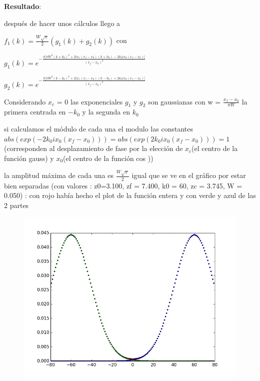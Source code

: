 \documentclass{article}
\begin{document}
\textbf{Resultado}:
\begin{description}
\item después de hacer unos cálculos llego a 
\item $f_1(k) = \frac{W \sqrt{\pi}}{2} (g_1(k) + g_2(k)) $ con
\item $g_1(k) =  e^{-\frac{\pi \big[ \pi  W^2 (k + k_0)^2   + 2  i x_c(x_f - x_0)(k+ k_0)   - 2 k_0 i x_0 (x_f-x_0) \big]}{(x_f-x_0)^2}}$
\item $g_2(k) = e^{-\frac{\pi \big[\pi  W^2 (k - k_0)^2  +2 i x_c(x_f - x_0)(k - k_0)  + 2 k_0 i x_0 (x_f-x_0)\big]}{(x_f - x_0)^2}} $


\item Considerando $x_c$ = 0 las exponenciales $g_1$ y $g_2$ son  gaussianas  con w = $\frac{x_f - x_0}{\pi W}$ la primera centrada en $-k_0$ y la segunda en $k_0$
\item si calculamos el módulo de cada una  el modulo las constantes $ abs(exp( - 2 k_0 i x_0 (x_f-x_0))) = abs(exp( 2 k_0 i x_0 (x_f-x_0)))  = 1$
(corresponden al desplazamiento de fase por la elección de $x_c$(el centro de la función gauss) y $x_0$(el centro de la función cos ))
\item la amplitud  máxima de cada una es $\frac{W \sqrt{\pi}}{2}$ igual que se ve en el gráfico por estar bien separadas (con valores :  z0=3.100, zf = 7.400, k0 = 60, zc = 3.745, W = 0.050) : con rojo había hecho el plot de la función entera y con verde y azul de las 2 partes 

\item \begin{figure}[!ht] 
 \centering 
 \includegraphics[scale=0.5]{gauss.png} 
\end{figure} 

\end{description}
\end{document}
